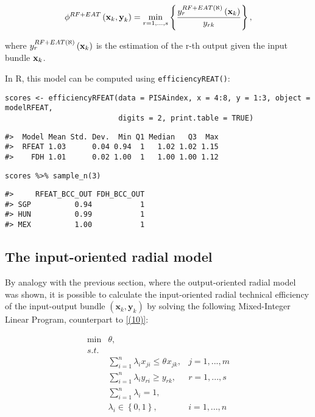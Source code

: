 \begin{equation} \label{(14)} 
\phi^{RF+EAT} \left({\it \textbf{x}}_{k} ,{\it \textbf{y}}_{k} \right)={\mathop{\min }\limits_{r=1,...,s}} \left\{\frac{y_{r}^{RF+EAT\left(\aleph \right)} \left({\it \textbf{x}}_{k} \right)}{y_{rk} } \right\},  
\end{equation}

where \(y_{r}^{RF+EAT\left(\aleph \right)} \left({\it \textbf{x}}_{k} \right)\) is the estimation of the r-th output given the input bundle \({\it \textbf{x}}_{k}\).

In R, this model can be computed using \texttt{efficiencyREAT()}:

\begin{verbatim}
scores <- efficiencyRFEAT(data = PISAindex, x = 4:8, y = 1:3, object = modelRFEAT, 
                          digits = 2, print.table = TRUE)
\end{verbatim}

\begin{verbatim}
#>  Model Mean Std. Dev.  Min Q1 Median   Q3  Max
#>  RFEAT 1.03      0.04 0.94  1   1.02 1.02 1.15
#>    FDH 1.01      0.02 1.00  1   1.00 1.00 1.12
\end{verbatim}

\begin{verbatim}
scores %>% sample_n(3)
\end{verbatim}

\begin{verbatim}
#>     RFEAT_BCC_OUT FDH_BCC_OUT
#> SGP          0.94           1
#> HUN          0.99           1
#> MEX          1.00           1
\end{verbatim}

\hypertarget{the-input-oriented-radial-model}{%
\subsection{The input-oriented radial model}\label{the-input-oriented-radial-model}}

By analogy with the previous section, where the output-oriented radial model was shown, it is possible to calculate the input-oriented radial technical efficiency of the input-output bundle \((\textbf{x}_k, \textbf{y}_k)\) by solving the following Mixed-Integer Linear Program, counterpart to \eqref{(10)}:

\begin{equation} \label{(15)} 
\begin{array}{lllll} {} & {\min } & {\theta, } & {} & {} \\ 
{} & {s.t.} & {} & {} & {} \\ 
{} & {} & {\sum_{i=1}^{n}\lambda_{i} x_{ji}  \le \theta_{} x_{jk} ,} & {j=1,...,m} & {} \\ 
{} & {} & {\sum_{i=1}^{n}\lambda_{i} y_{ri}  \ge y_{rk} ,} & {r=1,...,s} & {} \\ 
{} & {} & {\sum_{i=1}^{n}\lambda_{i}  =1,} & {} & {} \\ 
{} & {} & {\lambda_{i} \in \left\{0,1\right\},} & {i=1,...,n} & {} 
\end{array} 
\end{equation}

